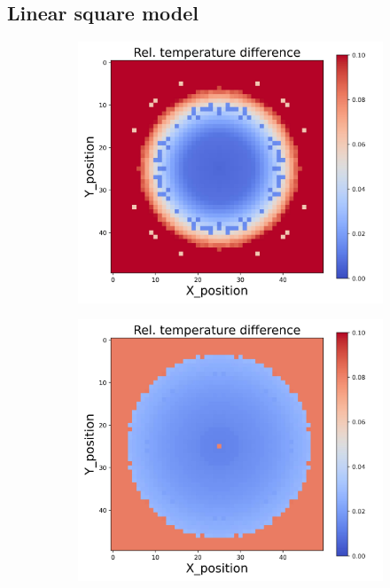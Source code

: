 \subsection{Linear square model}
\begin{figure}[h]
    \centering
    \begin{minipage}{\textwidth}
        \centering
        \begin{subfigure}{0.3\textwidth}
            \centering
            \includegraphics[width=\textwidth]{figures/raw_data/0/lin_square/T_bias.jpg}
        \end{subfigure}
        \begin{subfigure}{0.3\textwidth}
            \centering
            \includegraphics[width=\textwidth]{figures/raw_data/5/lin_square/T_bias.jpg}

\end{subfigure}
\end{minipage}
\end{figure}
